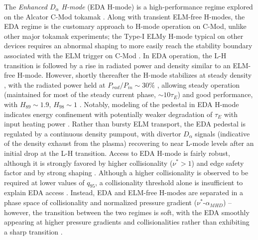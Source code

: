 The \emph{Enhanced $D_\alpha$ H-mode} (EDA H-mode) is a high-performance regime explored on the Alcator C-Mod tokamak \cite{Greenwald1999,Hubbard2001,Hughes2005}.  Along with transient ELM-free H-modes, the EDA regime is the customary approach to H-mode operation on C-Mod, unlike other major tokamak experiments; the Type-I ELMy H-mode typical on other devices requires an abnormal shaping to more easily reach the stability boundary associated with the ELM trigger on C-Mod \cite{Hughes2013}.  In EDA operation, the L-H transition is followed by a rise in radiated power and density similar to an ELM-free H-mode.  However, shortly thereafter the H-mode stabilizes at steady density \cite{Greenwald1999}, with the radiated power held at $P_{rad}/P_{in} \sim 30\%$ \cite{Hubbard1998}, allowing steady operation (maintained for most of the steady current phase, $\sim 10\tau_E$) and good performance, with $H_{89} \sim 1.9$, $H_{98} \sim 1$ \cite{Hubbard2001}.  Notably, modeling of the pedestal in EDA H-mode indicates energy confinement with potentially weaker degradation of $\tau_E$ with input heating power \cite{Hughes2002,Hughes2005,Hughes2006}.  Rather than bursty ELM transport, the EDA pedestal is regulated by a continuous density pumpout, with divertor $D_\alpha$ signals (indicative of the density exhaust from the plasma) recovering to near L-mode levels after an initial drop at the L-H transition.  Access to EDA H-mode is fairly robust, although it is strongly favored by higher collisionality ($\nu^* > 1$) and edge safety factor \cite{Hughes2002,Mossessian2002} and by strong shaping \cite{Mossessian2002}.  Although a higher collisionality is observed to be required at lower values of $q_{95}$, a collisionality threshold alone is insufficient to explain EDA access \cite{Hughes2002}.  Instead, EDA and ELM-free H-modes are separated in a phase space of collisionality and normalized pressure gradient ($\nu^*$-$\alpha_{MHD}$) -- however, the transition between the two regimes is soft, with the EDA smoothly appearing at higher pressure gradients and collisionalities rather than exhibiting a sharp transition \cite{Hughes2007a}.

